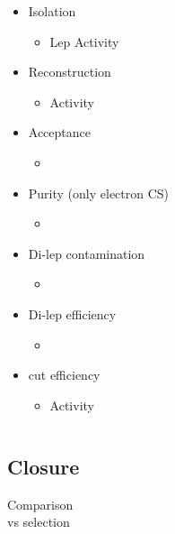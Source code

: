 \documentclass{beamer}
\begin{document}
\begin{frame}
\begin{columns}
\begin{column}{0.5\textwidth}
\begin{itemize}
        \item Isolation
   \begin{itemize}
    \item Lep \pt Activity
   \end{itemize}
   \item Reconstruction
   \begin{itemize}
    \item Activity
   \end{itemize}
   \item Acceptance
   \begin{itemize}
    \item\MHT \NJets
   \end{itemize}
   \item Purity (only electron CS)
   \begin{itemize}
    \item \MHT \NJets
   \end{itemize}
      \item Di-lep contamination
   \begin{itemize}
    \item \NJets
   \end{itemize}
   \item Di-lep efficiency
   \begin{itemize}
    \item \NJets
   \end{itemize}
   \item \mt cut efficiency
   \begin{itemize}
    \item Activity
   \end{itemize}
     \end{itemize}
    \end{column}
    \begin{column}{0.5\textwidth}

    \end{column}
  \end{columns}
\end{frame}

\subsection{Closure}
\begin{frame}
 \begin{center}
    {\Large Comparison \\ \deltaphi vs \mindeltaphi selection}
  \end{center}
\end{frame}
\end{document}
